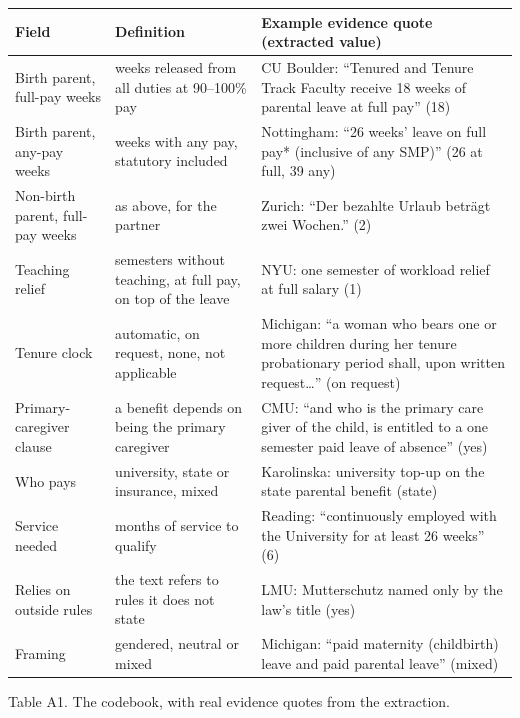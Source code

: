 \documentclass[10pt,twocolumn]{article}
\begin{document}
\begin{center}\small
\begin{tabular}{@{}p{3.6cm}p{6.2cm}p{6.4cm}@{}}
\toprule
Field & Definition & Example evidence quote (extracted value) \\ \midrule
Birth parent, full-pay weeks & weeks released from all duties at 90--100\% pay & CU Boulder: ``Tenured and Tenure Track Faculty receive 18 weeks of parental leave at full pay'' (18) \\
Birth parent, any-pay weeks & weeks with any pay, statutory included & Nottingham: ``26 weeks' leave on full pay* (inclusive of any SMP)'' (26 at full, 39 any) \\
Non-birth parent, full-pay weeks & as above, for the partner & Zurich: ``Der bezahlte Urlaub beträgt zwei Wochen.'' (2) \\
Teaching relief & semesters without teaching, at full pay, on top of the leave & NYU: one semester of workload relief at full salary (1) \\
Tenure clock & automatic, on request, none, not applicable & Michigan: ``a woman who bears one or more children during her tenure probationary period shall, upon written request\ldots'' (on request) \\
Primary-caregiver clause & a benefit depends on being the primary caregiver & CMU: ``and who is the primary care giver of the child, is entitled to a one semester paid leave of absence'' (yes) \\
Who pays & university, state or insurance, mixed & Karolinska: university top-up on the state parental benefit (state) \\
Service needed & months of service to qualify & Reading: ``continuously employed with the University for at least 26 weeks'' (6) \\
Relies on outside rules & the text refers to rules it does not state & LMU: Mutterschutz named only by the law's title (yes) \\
Framing & gendered, neutral or mixed & Michigan: ``paid maternity (childbirth) leave and paid parental leave'' (mixed) \\ \bottomrule
\end{tabular}

\smallskip
Table A1. The codebook, with real evidence quotes from the extraction.
\end{center}
\end{document}
